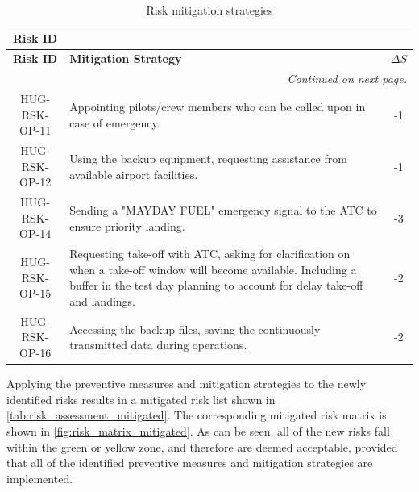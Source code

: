 \begin{longtable}{|c|p{12.5cm}|c|}
\caption{Risk mitigation strategies}
\label{tab:risk_mitigation_scenarios} \\

\hline
\textbf{Risk ID} & \centering{\textbf{Mitigation Strategy}} & \centering{\textbf{$\Delta S$}} \tabularnewline
\hline\hline
\endfirsthead

\hline
\textbf{Risk ID} & \textbf{Mitigation Strategy} & \textbf{$\Delta S$} \\
\hline\hline
\endhead

\hline
\multicolumn{3}{r}{\textit{Continued on next page.}} \\
\endfoot

\hline
\endlastfoot

HUG-RSK-OP-11 &
Appointing pilots/crew members who can be called upon in case of emergency.
& -1 \\ \hline

HUG-RSK-OP-12 &
Using the backup equipment, requesting assistance from available airport facilities.
& -1 \\ \hline

HUG-RSK-OP-14 &
Sending a "MAYDAY FUEL" emergency signal to the ATC to ensure priority landing.
& -3 \\ \hline

HUG-RSK-OP-15 &
Requesting take-off with ATC, asking for clarification on when a take-off window will become available. Including a buffer in the test day planning to account for delay take-off and landings.
& -2 \\ \hline

HUG-RSK-OP-16 &
Accessing the backup files, saving the continuously transmitted data during operations.
& -2 \\

\end{longtable}


 Applying the preventive measures and mitigation strategies to the newly identified risks results in a mitigated risk list shown in \autoref{tab:risk_assessment_mitigated}. The corresponding mitigated risk matrix is shown in \autoref{fig:risk_matrix_mitigated}. As can be seen, all of the new risks fall within the green or yellow zone, and therefore are deemed acceptable, provided that all of the identified preventive measures and mitigation strategies are implemented.

